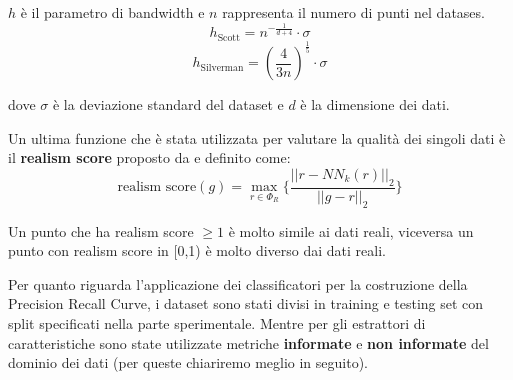 \(h\) è il parametro di bandwidth e \(n\) rappresenta il numero di punti nel datases.
\begin{equation}
    h_{\text{Scott}} = n^{-\frac{1}{d+4}} \cdot \sigma
\end{equation}
\begin{equation}
    h_{\text{Silverman}} = \left(\frac{4}{3n}\right)^{\frac{1}{5}} \cdot \sigma
\end{equation}

dove \(\sigma\) è la deviazione standard del dataset e \(d\) è la dimensione dei dati.

Un ultima funzione che è stata utilizzata per valutare la qualità dei singoli dati è il \textbf{realism score} proposto da \cite{2ImprovedPrecisionRecall} e definito come:
\begin{equation}
    \text{realism score}(g) = \max_{r \in \Phi_R} \{ \frac{||r-NN_k(r)||_2}{||g-r||_2} \}
\end{equation}

Un punto che ha realism score \(\ge 1\) è molto simile ai dati reali, viceversa un punto con realism score in [0,1) è molto diverso dai dati reali.

Per quanto riguarda l'applicazione dei classificatori per la costruzione della Precision Recall Curve, i dataset sono stati divisi in training e testing set con split specificati nella parte sperimentale. Mentre per gli estrattori di caratteristiche sono state utilizzate metriche \textbf{informate} e \textbf{non informate} del dominio dei dati (per queste chiariremo meglio in seguito).
